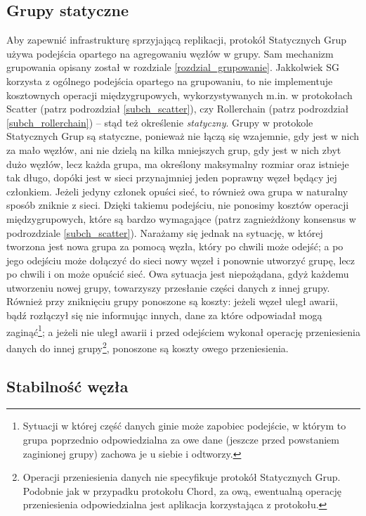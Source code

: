\documentclass[12pt, twoside, openany]{report}
\begin{document}
\subsection{Grupy statyczne}
Aby zapewnić infrastrukturę sprzyjającą replikacji, protokół Statycznych Grup używa podejścia opartego na agregowaniu węzłów w grupy. Sam mechanizm grupowania opisany został w rozdziale \ref{rozdzial_grupowanie}. Jakkolwiek SG korzysta z ogólnego podejścia opartego na grupowaniu, to nie implementuje kosztownych operacji międzygrupowych, wykorzystywanych m.in. w protokołach Scatter (patrz podrozdział \ref{subch_scatter}), czy Rollerchain (patrz podrozdział \ref{subch_rollerchain}) -- stąd też określenie \textit{statyczny}. Grupy w protokole Statycznych Grup są statyczne, ponieważ nie łączą się wzajemnie, gdy jest w nich za mało węzłów, ani nie dzielą na kilka mniejszych grup, gdy jest w nich zbyt dużo węzłów, lecz każda grupa, ma określony maksymalny rozmiar oraz istnieje tak długo, dopóki jest w sieci przynajmniej jeden poprawny węzeł będący jej członkiem. Jeżeli jedyny członek opuści sieć, to również owa grupa w naturalny sposób zniknie z sieci. Dzięki takiemu podejściu, nie ponosimy kosztów operacji międzygrupowych, które są bardzo wymagające (patrz zagnieżdżony konsensus w podrozdziale \ref{subch_scatter}). Narażamy się jednak na sytuację, w której tworzona jest nowa grupa za pomocą węzła, który po chwili może odejść; a po jego odejściu może dołączyć do sieci nowy węzeł i ponownie utworzyć grupę, lecz po chwili i on może opuścić sieć. Owa sytuacja jest niepożądana, gdyż każdemu utworzeniu nowej grupy, towarzyszy przesłanie części danych z innej grupy. Również przy zniknięciu grupy ponoszone są koszty: jeżeli węzeł uległ awarii, bądź rozłączył się nie informując innych, dane za które odpowiadał mogą zaginąć\footnote{Sytuacji w której część danych ginie może zapobiec podejście, w którym to grupa poprzednio odpowiedzialna za owe dane (jeszcze przed powstaniem zaginionej grupy) zachowa je u siebie i odtworzy.}; a jeżeli nie uległ awarii i przed odejściem wykonał operację przeniesienia danych do innej grupy\footnote{Operacji przeniesienia danych nie specyfikuje protokół Statycznych Grup. Podobnie jak w przypadku protokołu Chord, za ową, ewentualną operację przeniesienia odpowiedzialna jest aplikacja korzystająca z protokołu.}, ponoszone są koszty owego przeniesienia.

\subsection{Stabilność węzła}
\label{stabilnosc_wezla}
\end{document}
